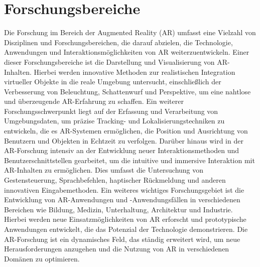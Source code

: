 \section{Forschungsbereiche}
Die Forschung im Bereich der Augmented Reality (AR) umfasst eine Vielzahl von
Disziplinen und Forschungsbereichen, die darauf abzielen, die Technologie,
Anwendungen und Interaktionsmöglichkeiten von AR weiterzuentwickeln. Einer
dieser Forschungsbereiche ist die Darstellung und Visualisierung von
AR-Inhalten. Hierbei werden innovative Methoden zur realistischen Integration
virtueller Objekte in die reale Umgebung untersucht, einschließlich der
Verbesserung von Beleuchtung, Schattenwurf und Perspektive, um eine nahtlose
und überzeugende AR-Erfahrung zu schaffen. Ein weiterer Forschungsschwerpunkt
liegt auf der Erfassung und Verarbeitung von Umgebungsdaten, um präzise
Tracking- und Lokalisierungstechniken zu entwickeln, die es AR-Systemen
ermöglichen, die Position und Ausrichtung von Benutzern und Objekten in
Echtzeit zu verfolgen. Darüber hinaus wird in der AR-Forschung intensiv an der
Entwicklung neuer Interaktionsmethoden und Benutzerschnittstellen gearbeitet,
um die intuitive und immersive Interaktion mit AR-Inhalten zu ermöglichen. Dies
umfasst die Untersuchung von Gestensteuerung, Sprachbefehlen, haptischer
Rückmeldung und anderen innovativen Eingabemethoden. Ein weiteres wichtiges
Forschungsgebiet ist die Entwicklung von AR-Anwendungen und -Anwendungsfällen
in verschiedenen Bereichen wie Bildung, Medizin, Unterhaltung, Architektur und
Industrie. Hierbei werden neue Einsatzmöglichkeiten von AR erforscht und
prototypische Anwendungen entwickelt, die das Potenzial der Technologie
demonstrieren. Die AR-Forschung ist ein dynamisches Feld, das ständig erweitert
wird, um neue Herausforderungen anzugehen und die Nutzung von AR in
verschiedenen Domänen zu optimieren.